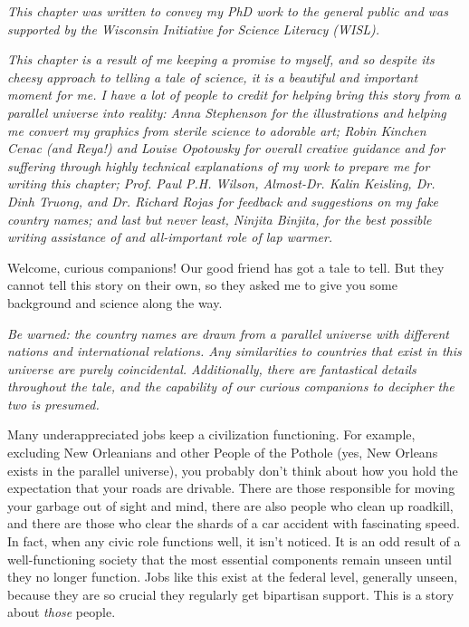 {
\setlength{\parindent}{0pt}
\setlength{\parskip}{1em}

\begin{quoting}
  {
  \footnotesize
  \textit{This chapter was written to convey my PhD work to the general public
  and was supported by the Wisconsin Initiative for Science Literacy (WISL).}
  
  \textit{This chapter is a result of me keeping a promise to myself, and so
  despite its cheesy approach to telling a tale of science, it is a beautiful
  and important moment for me. I have a lot of people to credit for helping
  bring this story from a parallel universe into reality: Anna Stephenson for
  the illustrations and helping me convert my graphics from sterile science to
  adorable art; Robin Kinchen Cenac (and Reya!) and Louise Opotowsky for
  overall creative guidance and for suffering through highly technical
  explanations of my work to prepare me for writing this chapter; Prof. Paul
  P.H. Wilson, Almost-Dr.  Kalin Keisling, Dr. Dinh Truong, and Dr. Richard
  Rojas for feedback and suggestions on my fake country names; and last but
  never least, Ninjita Binjita, for the best possible writing assistance of and
  all-important role of lap warmer.} 
  }
\end{quoting}

\narr Welcome, curious companions! Our good friend has got a tale to tell.  But
they cannot tell this story on their own, so they asked me to give you some
background and science along the way.

\textit{Be warned: the country names are drawn from a parallel universe with
different nations and international relations. Any similarities to countries
that exist in this universe are purely coincidental. Additionally, there are
fantastical details throughout the tale, and the capability of our curious
companions to decipher the two is presumed.}

Many underappreciated jobs keep a civilization functioning. For example,
excluding New Orleanians and other People of the Pothole (yes, New Orleans
exists in the parallel universe), you probably don't think about how you hold
the expectation that your roads are drivable. There are those responsible for
moving your garbage out of sight and mind, there are also people who clean up
roadkill, and there are those who clear the shards of a car accident with
fascinating speed. In fact, when any civic role functions well, it isn't
noticed. It is an odd result of a well-functioning society that the most
essential components remain unseen until they no longer function. Jobs like
this exist at the federal level, generally unseen, because they are so crucial
they regularly get bipartisan support. This is a story about \textit{those}
people.

}
